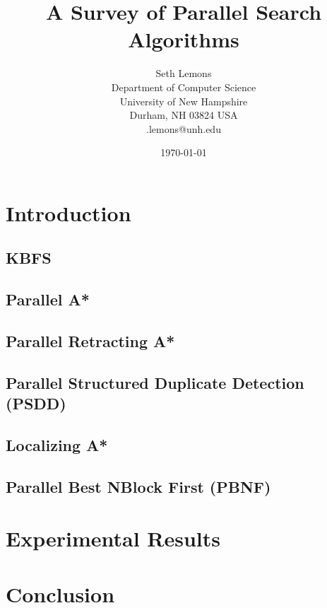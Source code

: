 \documentclass{article}
\title{A Survey of Parallel Search Algorithms}
\author{Seth Lemons \\
Department of Computer Science \\
University of New Hampshire \\
Durham, NH 03824 USA \\
\seth.lemons@unh.edu}
\date{\today}
\begin{document}
\maketitle

\begin{abstract}
\end{abstract}

\section{Introduction}
\subsection{KBFS}
\subsection{Parallel A*}
\subsection{Parallel Retracting A*}
\subsection{Parallel Structured Duplicate Detection (PSDD)}
\subsection{Localizing A*}
\subsection{Parallel Best NBlock First (PBNF)}
\section{Experimental Results}
\section{Conclusion}



\end{document}
